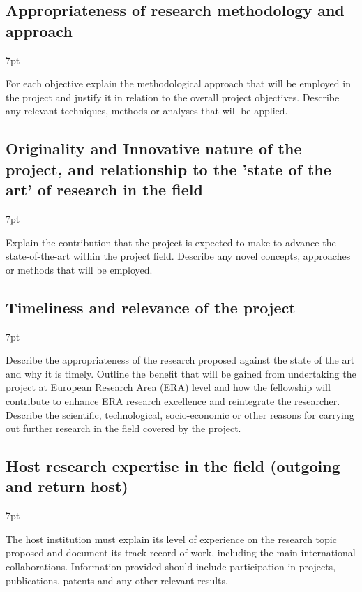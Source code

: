 \documentclass[11pt]{ltxdoc}
\newenvironment{formal}{%
  \def\FrameCommand{%
    \hspace{1pt}%
    {\color{darkblue}\vrule width 2pt}%
    {\color{formalshade}\vrule width 4pt}%
    \colorbox{formalshade}%
  }%
  \MakeFramed{\advance\hsize-\width\FrameRestore}%
  \noindent\hspace{-4.55pt}%
  \begin{adjustwidth}{}{7pt}%
  \vspace{2pt}\vspace{2pt}%
}
{%
  \vspace{2pt}\end{adjustwidth}\endMakeFramed%
}
\begin{document}
\subsection{Appropriateness of research methodology and approach}

\begin{formal}
  For each objective explain the methodological approach that will be
  employed in the project and justify it in relation to the overall
  project objectives. Describe any relevant techniques, methods or
  analyses that will be applied.
\end{formal}

\subsection{Originality and Innovative nature of the project, and
  relationship to the 'state of the art' of research in the field }

\begin{formal}
  Explain the contribution that the project is expected to make to
  advance the state-of-the-art within the project field. Describe any
  novel concepts, approaches or methods that will be employed.
\end{formal}

\subsection{Timeliness and relevance of the project}

\begin{formal}
  Describe the appropriateness of the research proposed against the
  state of the art and why it is timely. Outline the benefit that will
  be gained from undertaking the project at European Research Area
  (ERA) level and how the fellowship will contribute to enhance ERA
  research excellence and reintegrate the researcher. Describe the
  scientific, technological, socio-economic or other reasons for
  carrying out further research in the field covered by the project.
\end{formal}

\subsection{Host research expertise in the field (outgoing and return
  host)}

\begin{formal}
  The host institution must explain its level of experience on the
  research topic proposed and document its track record of work,
  including the main international collaborations. Information
  provided should include participation in projects, publications,
  patents and any other relevant results.
\end{formal}
\end{document}
